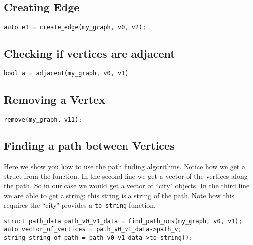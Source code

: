 \documentclass{article}
\begin{document}
\subsection{Creating Edge}
\begin{lstlisting}
auto e1 = create_edge(my_graph, v0, v2);
\end{lstlisting}

\subsection{Checking if vertices are adjacent}
\begin{lstlisting}
bool a = adjacent(my_graph, v0, v1)
\end{lstlisting}

\subsection{Removing a Vertex}
\begin{lstlisting}
remove(my_graph, v11);
\end{lstlisting}

\subsection{Finding a path between Vertices}
Here we show you how to use the path finding algorithms. Notice how we get a struct from the function. In the second line we get a vector of the vertices along the path. So in our case we would get a vector of ``city" objects. In the third line we are able to get a string; this string is a string of the path. Note how this requires the ``city" provides a \texttt{to\_string} function.
\begin{lstlisting}
struct path_data path_v0_v1_data = find_path_ucs(my_graph, v0, v1);
auto vector_of_vertices = path_v0_v1_data->path_v;
string string_of_path = path_v0_v1_data->to_string();
\end{lstlisting}
\end{document}
